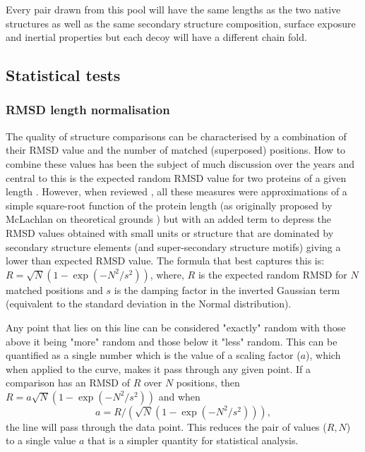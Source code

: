 \documentclass[12pt]{article}
\newcommand{\3}{$3_{10}$}
\begin{document}
Every pair drawn from this pool will have the same lengths as the two native structures
as well as the same secondary structure composition, surface exposure and inertial properties
but each decoy will have a different chain fold.


\subsection{Statistical tests}

\subsubsection{RMSD length normalisation}

The quality of structure comparisons can be characterised by a combination of their
RMSD value and the number of matched (superposed) positions.  How to combine these values has
been the subject of much discussion over the years and central to this is the expected random
RMSD value for two proteins of a given length \cite{McLachlanAD84,CohenFEet80d,MaiorovVNet94}.   However,
when reviewed \cite{TaylorWR06a}, all these measures were approximations of a simple square-root function of
the protein length (as originally proposed by McLachlan on theoretical grounds \cite{McLachlanAD84})
but with an added term to depress the RMSD values obtained with small units or structure
that are dominated by secondary structure elements (and super-secondary structure motifs) 
giving a lower than expected RMSD value.   The formula that best captures this is:
$R = \surd N (1-\exp(-N^2/s^2))$,
where,
$R$ is the expected random RMSD for $N$ matched positions and $s$ is the damping factor in the inverted
Gaussian term (equivalent to the standard deviation in the Normal distribution).  

Any point that lies on this line can be considered "exactly" random
with those above it being "more" random and those below it "less" random.  This can be quantified
as a single number which is the value of a scaling factor ($a$), which when applied to the curve, makes it
pass through any given point.   If a comparison has an RMSD of $R$ over $N$ positions, then
$R = a\surd N (1-\exp(-N^2/s^2))$ and when
\begin{equation}
\label{Eqn:fit}
a = R/(\surd N (1-\exp(-N^2/s^2))), 
\end{equation}
the line will pass through the data point.  This reduces the pair of values ($R,N$) to a
single value $a$ that is a simpler quantity for statistical analysis.
\end{document}
